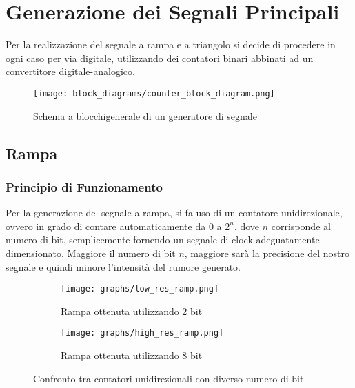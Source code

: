 \chapter{Generazione dei Segnali Principali}


Per la realizzazione del segnale a rampa e a triangolo si decide di procedere in ogni caso
per via digitale, utilizzando dei contatori binari abbinati ad un convertitore
digitale-analogico.
\medskip

\begin{figure}[ht]
    \centering
    \texttt{[image: block\_diagrams/counter\_block\_diagram.png]}
    \caption{Schema a blocchigenerale di un generatore di segnale}
    \label{counter_block_diagram}
\end{figure}


\section{Rampa}


\subsection*{Principio di Funzionamento}


Per la generazione del segnale a rampa, si fa uso di un contatore unidirezionale, ovvero in
grado di contare automaticamente da $0$ a $2^n$, dove $n$ corrisponde al numero di bit,
semplicemente fornendo un segnale di clock adeguatamente dimensionato. Maggiore il numero di
bit $n$, maggiore sarà la precisione del nostro segnale e quindi minore l'intensità del rumore
generato.
\medskip

\begin{figure}[ht]
    \centering

    \begin{subfigure}{.5\textwidth}
        \centering
        \texttt{[image: graphs/low\_res\_ramp.png]}
        \caption{Rampa ottenuta utilizzando 2 bit}
        \label{low_res_ramp}
    \end{subfigure}%
    \begin{subfigure}{.5\textwidth}
        \centering
        \texttt{[image: graphs/high\_res\_ramp.png]}
        \caption{Rampa ottenuta utilizzando 8 bit}
        \label{high_res_ramp}
    \end{subfigure}

    \caption{Confronto tra contatori unidirezionali con diverso numero di bit}
    \label{ramps}
\end{figure}

